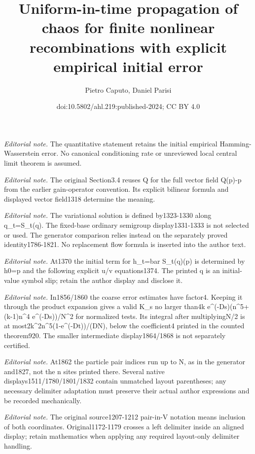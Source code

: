 \documentclass[10pt,a4paper]{article}
\title{Uniform-in-time propagation of chaos for finite nonlinear recombinations with explicit empirical initial error}
\author{Pietro Caputo, Daniel Parisi}
\date{doi:10.5802/ahl.219:published-2024; CC BY 4.0}
\begin{document}
\maketitle
\noindent\textit{Editorial note.} The quantitative statement retains the initial empirical Hamming-Wasserstein error. No canonical conditioning rate or unreviewed local central limit theorem is assumed.\par\medskip
\noindent\textit{Editorial note.} The original Section3.4 reuses Q for the full vector field Q(p)-p from the earlier gain-operator convention. Its explicit bilinear formula and displayed vector field1318 determine the meaning.\par\medskip
\noindent\textit{Editorial note.} The variational solution is defined by1323-1330 along q\_t=S\_t(q). The fixed-base ordinary semigroup display1331-1333 is not selected or used. The generator comparison relies instead on the separately proved identity1786-1821. No replacement flow formula is inserted into the author text.\par\medskip
\noindent\textit{Editorial note.} At1370 the initial term for h\_t=bar S\_t(q)(p) is determined by h0=p and the following explicit u/v equations1374. The printed q is an initial-value symbol slip; retain the author display and disclose it.\par\medskip
\noindent\textit{Editorial note.} In1856/1860 the coarse error estimates have factor4. Keeping it through the product expansion gives a valid K\_s no larger than4k e\textasciicircum{}(-Ds)(n\textasciicircum{}5+(k-1)n\textasciicircum{}4 e\textasciicircum{}(-Ds))/N\textasciicircum{}2 for normalized tests. Its integral after multiplyingN/2 is at most2k\textasciicircum{}2n\textasciicircum{}5(1-e\textasciicircum{}(-Dt))/(DN), below the coefficient4 printed in the counted theorem920. The smaller intermediate display1864/1868 is not separately certified.\par\medskip
\noindent\textit{Editorial note.} At1862 the particle pair indices run up to N, as in the generator and1827, not the n sites printed there. Several native displays1511/1780/1801/1832 contain unmatched layout parentheses; any necessary delimiter adaptation must preserve their actual author expressions and be recorded mechanically.\par\medskip
\noindent\textit{Editorial note.} The original source1207-1212 pair-in-V notation means inclusion of both coordinates. Original1172-1179 crosses a left delimiter inside an aligned display; retain mathematics when applying any required layout-only delimiter handling.\par\medskip
\end{document}

